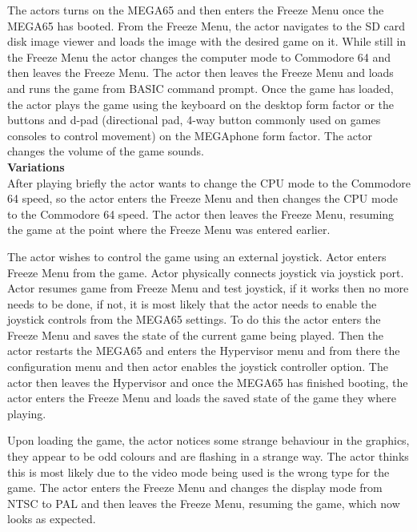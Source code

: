 The actors turns on the MEGA65 and then enters the Freeze Menu once the MEGA65 has booted. From the Freeze Menu, the actor navigates to the SD card disk image viewer and loads the image with the desired game on it. While still in the Freeze Menu the actor changes the computer mode to Commodore 64 and then leaves the Freeze Menu. The actor then leaves the Freeze Menu and loads and runs the game from BASIC command prompt. Once the game has loaded, the actor plays the game using the keyboard on the desktop form factor or the buttons and d-pad (directional pad, 4-way button commonly used on games consoles to control movement) on the MEGAphone form factor. The actor changes the volume of the game sounds.\\

\textbf{Variations}\\
After playing briefly the actor wants to change the CPU mode to the Commodore 64 speed, so the actor enters the Freeze Menu and then changes the CPU mode to the Commodore 64 speed. The actor then leaves the Freeze Menu, resuming the game at the point where the Freeze Menu was entered earlier. 

The actor wishes to control the game using an external joystick. Actor enters Freeze Menu from the game. Actor physically connects joystick via joystick port. Actor resumes game from Freeze Menu and test joystick, if it works then no more needs to be done, if not, it is most likely that the actor needs to enable the joystick controls from the MEGA65 settings. To do this the actor enters the Freeze Menu and saves the state of the current game being played. Then the actor restarts the MEGA65 and enters the Hypervisor menu and from there the configuration menu and then actor enables the joystick controller option. The actor then leaves the Hypervisor and once the MEGA65 has finished booting, the actor enters the Freeze Menu and loads the saved state of the game they where playing. 

Upon loading the game, the actor notices some strange behaviour in the graphics, they appear to be odd colours and are flashing in a strange way. The actor thinks this is most likely due to the video mode being used is the wrong type for the game. The actor enters the Freeze Menu and changes the display mode from NTSC to PAL and then leaves the Freeze Menu, resuming the game, which now looks as expected.\\

